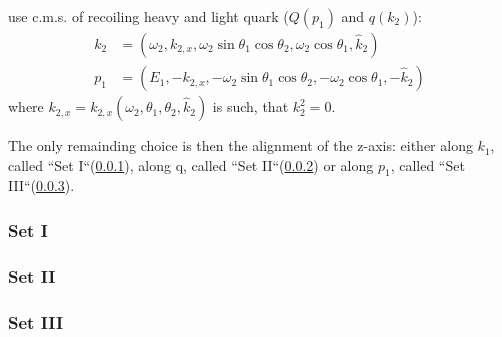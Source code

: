 use c.m.s. of recoiling heavy and light quark ($Q(p_1)$ and $q(k_2)$):
\begin{align}
k_2 &= (\omega_2,k_{2,x},\omega_2\sin\theta_1\cos\theta_2,\omega_2\cos\theta_1, \hat k_2)\\
p_1 &= (E_1,-k_{2,x},-\omega_2\sin\theta_1\cos\theta_2,-\omega_2\cos\theta_1, -\hat k_2)
\end{align}
where $k_{2,x}=k_{2,x}(\omega_2,\theta_1,\theta_2,\hat k_2)$ is such, that $k_2^2=0$.

The only remainding choice is then the alignment of the z-axis: either along $k_1$, called ``Set I``(\ref{sec:Phasespace.2to3.Framework.SetI}), along q, called ``Set II``(\ref{sec:Phasespace.2to3.Framework.SetII}) or along $p_1$, called ``Set III``(\ref{sec:Phasespace.2to3.Framework.SetIII}).

\subsubsection{Set I}
\label{sec:Phasespace.2to3.Framework.SetI}


\subsubsection{Set II}
\label{sec:Phasespace.2to3.Framework.SetII}


\subsubsection{Set III}
\label{sec:Phasespace.2to3.Framework.SetIII}

